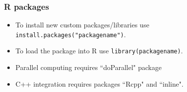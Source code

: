 \documentclass{beamer}
\begin{document}
\begin{frame}[fragile]\frametitle{R packages}
	\begin{itemize}
		\item To install new custom packages/libraries use \verb|install.packages("packagename")|.
		\item To load the package into R use \verb|library(packagename)|.
		\item Parallel computing requires ``doParallel" package
		\item C++ integration requires packages ``Rcpp" and ``inline".
	\end{itemize}
\end{frame}
%
\end{document}
